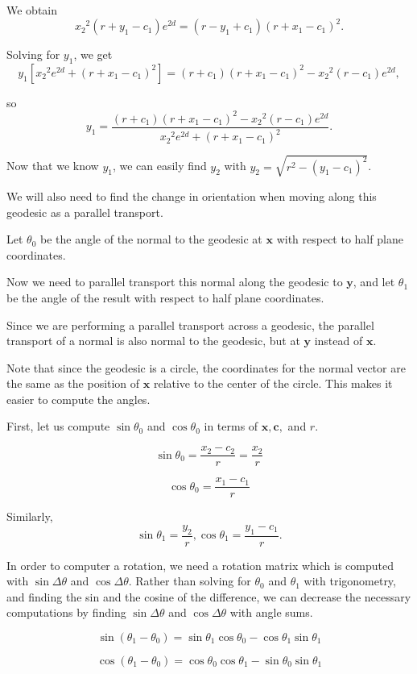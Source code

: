 We obtain $${x_2}^2(r+y_1-c_1)e^{2d} = (r-y_1+c_1)(r+x_1-c_1)^2.$$

Solving for $y_1$, we get $$y_1[{x_2}^2e^{2d}+(r+x_1-c_1)^2] = (r+c_1)(r+x_1-c_1)^2-{x_2}^2(r-c_1)e^{2d},$$

so $$y_1 = \frac{(r+c_1)(r+x_1-c_1)^2-{x_2}^2(r-c_1)e^{2d}}{{x_2}^2e^{2d}+(r+x_1-c_1)^2}.$$

Now that we know $y_1$, we can easily find $y_2$ with $y_2 = \sqrt{r^2-({y_1}-c_1)^2}$.

We will also need to find the change in orientation when moving along this geodesic as a parallel transport.


Let $\theta_0$ be the angle of the normal to the geodesic at $\textbf{x}$ with respect to half plane coordinates.

Now we need to parallel transport this normal along the geodesic to $\textbf{y}$, and let $\theta_1$ be the angle of the result with respect to half plane coordinates.

Since we are performing a parallel transport across a geodesic, the parallel transport of a normal is also normal to the geodesic, but at $\textbf{y}$ instead of $\textbf{x}$.

Note that since the geodesic is a circle, the coordinates for the normal vector are the same as the position of $\textbf{x}$ relative to the center of the circle. This makes it easier to compute the angles.

First, let us compute $\sin\theta_0$ and $\cos\theta_0$ in terms of $\textbf{x}, \textbf{c},$ and $r$.

$$\sin \theta_0 = \frac{x_2-c_2}{r} = \frac{x_2}{r}$$

$$\cos \theta_0 = \frac{x_1-c_1}{r}$$

Similarly, $$\sin \theta_1 = \frac{y_2}{r}, \cos \theta_1 = \frac{y_1-c_1}{r}.$$

In order to computer a rotation, we need a rotation matrix which is computed with $\sin \Delta\theta$ and $\cos \Delta\theta$. Rather than solving for $\theta_0$ and $\theta_1$ with trigonometry, and finding the sin and the cosine of the difference, we can decrease the necessary computations by finding $\sin \Delta\theta$ and $\cos \Delta\theta$ with angle sums.

$$\sin(\theta_1-\theta_0) = \sin\theta_1 \cos\theta_0 - \cos\theta_1 \sin\theta_1$$

$$\cos(\theta_1-\theta_0) = \cos\theta_0 \cos\theta_1 - \sin\theta_0 \sin\theta_1$$

